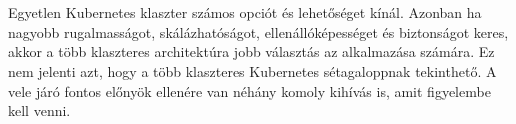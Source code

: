 \chapter{\summary}
Egyetlen Kubernetes klaszter számos opciót és lehetőséget kínál.
Azonban ha nagyobb rugalmasságot, skálázhatóságot, ellenállóképességet és biztonságot keres, akkor a több klaszteres architektúra jobb választás az alkalmazása számára.
Ez nem jelenti azt, hogy a több klaszteres Kubernetes sétagaloppnak tekinthető. A vele járó fontos előnyök ellenére van néhány komoly kihívás is, amit figyelembe kell venni.

